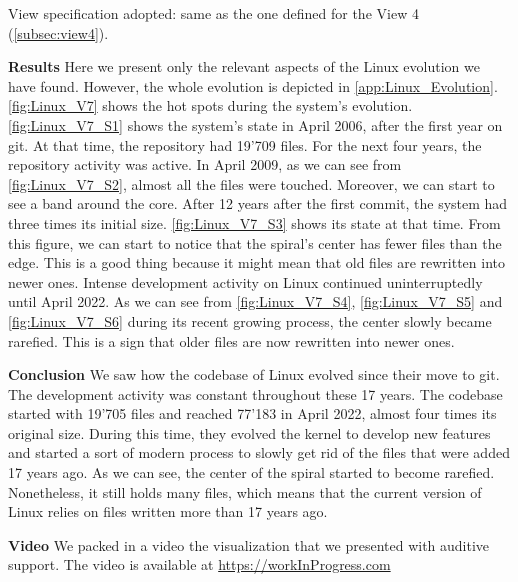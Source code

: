 View specification adopted: same as the one defined for the View 4 (\autoref{subsec:view4}).

\textbf{Results}
Here we present only the relevant aspects of the Linux evolution we have found. However, the whole evolution is depicted in \autoref{app:Linux_Evolution}. \autoref{fig:Linux_V7} shows the hot spots during the system's evolution. \autoref{fig:Linux_V7_S1} shows the system's state in April 2006, after the first year on git. At that time, the repository had 19'709 files. For the next four years, the repository activity was active. In April 2009, as we can see from  \autoref{fig:Linux_V7_S2}, almost all the files were touched. Moreover, we can start to see a band around the core. 
After 12 years after the first commit, the system had three times its initial size. \autoref{fig:Linux_V7_S3} shows its state at that time. From this figure, we can start to notice that the spiral's center has fewer files than the edge. This is a good thing because it might mean that old files are rewritten into newer ones. Intense development activity on Linux continued uninterruptedly until April 2022. As we can see from \autoref{fig:Linux_V7_S4}, \autoref{fig:Linux_V7_S5} and \autoref{fig:Linux_V7_S6} during its recent growing process, the center slowly became rarefied. This is a sign that older files are now rewritten into newer ones. 

\textbf{Conclusion}
 We saw how the codebase of Linux evolved since their move to git. The development activity was constant throughout these 17 years. The codebase started with 19'705 files and reached 77'183 in April 2022, almost four times its original size. During this time, they evolved the kernel to develop new features and started a sort of modern process to slowly get rid of the files that were added 17 years ago. As we can see, the center of the spiral started to become rarefied. Nonetheless, it still holds many files, which means that the current version of Linux relies on files written more than 17 years ago. 

\textbf{Video}
We packed in a video the visualization that we presented with auditive support. The video is available at \url{https://workInProgress.com}


